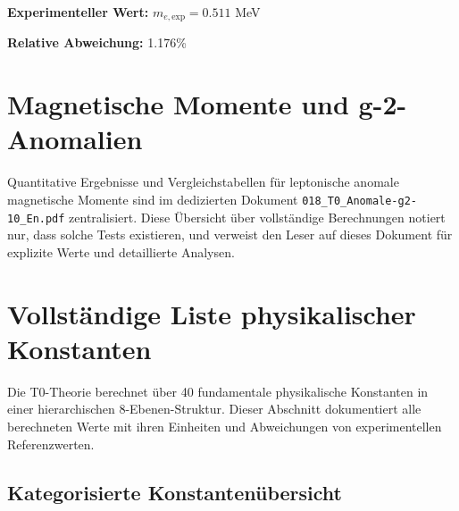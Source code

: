 \documentclass[12pt,a4paper]{report}
\begin{document}
	\textbf{Experimenteller Wert:} $m_{e,\text{exp}} = 0.511$ MeV
	
	\textbf{Relative Abweichung:} 1.176\%
	
	\section{Magnetische Momente und g-2-Anomalien}
	
	Quantitative Ergebnisse und Vergleichstabellen für leptonische anomale magnetische Momente sind
	im dedizierten Dokument \texttt{018\_T0\_Anomale-g2-10\_En.pdf} zentralisiert.
	Diese Übersicht über vollständige Berechnungen notiert nur, dass solche Tests existieren, und verweist den Leser
	auf dieses Dokument für explizite Werte und detaillierte Analysen.
	
	\section{Vollständige Liste physikalischer Konstanten}
	
	Die T0-Theorie berechnet über 40 fundamentale physikalische Konstanten in einer hierarchischen 8-Ebenen-Struktur. Dieser Abschnitt dokumentiert alle berechneten Werte mit ihren Einheiten und Abweichungen von experimentellen Referenzwerten.
	
	\subsection{Kategorisierte Konstantenübersicht}
	
	\begin{table}[h]
		\centering
		\caption{Kategoriebasierte Fehlerstatistik der T0-Konstantenberechnungen}
	\end{table}
	
\end{document}
